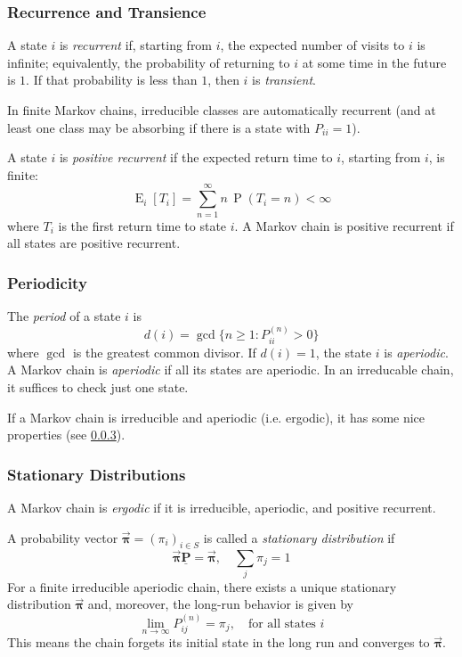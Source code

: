 \documentclass[11pt, headings=standardclasses, parskip=half, twoside]{scrartcl}
\newcommand{\matr}[1]{\underline{\boldsymbol{#1}}}
\newcommand{\vect}[1]{\vec{\boldsymbol{#1}}}
\newcommand{\Exp}{\operatorname{E}}
\newcommand{\Prob}{\operatorname{P}}
\begin{document}
\subsubsection{Recurrence and Transience}
\label{subsubsec:recurrence_transience}
\begin{definition}\label{def:recurrence_transience}
A state \(i\) is \emph{recurrent} if, starting from \(i\), the expected number of visits to \(i\) is infinite;
equivalently, the probability of returning to \(i\) at some time in the future is \(1\).
If that probability is less than \(1\), then \(i\) is \emph{transient}.
\end{definition}
In finite Markov chains, irreducible classes are automatically recurrent (and at least one class may be absorbing if there is a state with \(P_{ii}=1\)).

\begin{definition}\label{def:posrec}
A state \(i\) is \emph{positive recurrent} if the expected return time to \(i\), starting from \(i\), is finite:
\[
\Exp_i[T_i]=\sum_{n=1}^{\infty} n\,\Prob(T_i=n)<\infty
\]
where \(T_i\) is the first return time to state \(i\).
A Markov chain is positive recurrent if all states are positive recurrent.
\end{definition}

\subsubsection{Periodicity}
\label{subsubsec:periodicity}

\begin{definition}[Period]\label{def:period}
  The \emph{period} of a state \(i\) is
  \[
  d(i)=\gcd\{n\ge 1: P_{ii}^{(n)}>0\}
  \]
  where \(\gcd\) is the greatest common divisor.
  If \(d(i)=1\), the state \(i\) is \emph{aperiodic}.
  A Markov chain is \emph{aperiodic} if all its states are aperiodic.
  In an irreducable chain, it suffices to check just one state.
\end{definition}
If a Markov chain is irreducible and aperiodic (i.e. ergodic), it has some nice properties (see \ref{subsubsec:stationary_distributions}).

\subsubsection{Stationary Distributions}\label{subsubsec:stationary_distributions}
\begin{definition}[Ergodicity]\label{def:ergodic}
A Markov chain is \emph{ergodic} if it is irreducible, aperiodic, and positive recurrent. 
\end{definition}
A probability vector \(\vect{\pi}=(\pi_i)_{i\in S}\) is called a \emph{stationary distribution} if
\[
\vect{\pi} \matr{P}=\vect{\pi},\quad \sum_{j}\pi_j=1
\]
For a finite irreducible aperiodic chain, there exists a unique stationary distribution \(\vect{\pi}\) and, moreover, the long-run behavior is given by
\[
\lim_{n\to\infty} P_{ij}^{(n)}=\pi_j,\quad \text{for all states } i
\]
This means the chain forgets its initial state in the long run and converges to \(\vect{\pi}\).
\end{document}

